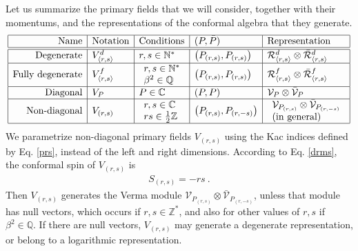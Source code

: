 \documentclass[12pt, a4paper]{article}
\theoremstyle{break}
\begin{document}
Let us summarize the primary fields that we will consider, together with their momentums, and the representations of the conformal algebra that they generate. 
\begin{align}
 \begin{array}{|r|l|l|l|l|}
  \hline 
  \text{Name} & \text{Notation} & \text{Conditions} & (P, \bar P) & \text{Representation}
  \\
  \hline \hline 
  \text{Degenerate} &  V^d_{\langle r,s\rangle} &  r,s\in\mathbb{N}^* & \left(P_{(r,s)},P_{(r,s)}\right)  & \mathcal{R}^d_{\langle r,s\rangle}\otimes \bar{\mathcal{R}}^d_{\langle r,s\rangle} 
  \\
  \hline 
  \text{Fully degenerate} & V^f_{\langle r,s\rangle} & \begin{array}{l} r,s\in\mathbb{N}^* \\ \beta^2\in\mathbb{Q} \end{array} & \left(P_{(r,s)},P_{(r,s)}\right)  & \mathcal{R}^f_{\langle r,s\rangle}\otimes \bar{\mathcal{R}}^f_{\langle r,s\rangle} 
  \\
  \hline 
  \text{Diagonal} & V_P & P\in\mathbb{C} & \left(P,P\right) & \mathcal{V}_P\otimes \bar{\mathcal{V}}_P 
  \\
  \hline 
  \text{Non-diagonal} & V_{(r,s)} & 
  \begin{array}{l} r,s\in\mathbb{C} \\ 
  rs\in \tfrac12\mathbb{Z} \end{array} & \left(P_{(r,s)},P_{(r,-s)}\right) & 
  \begin{array}{l} \mathcal{V}_{P_{(r,s)}} \otimes \bar{\mathcal{V}}_{P_{(r,-s)}} \\ \text{(in general)} \end{array}
  \\
  \hline 
 \end{array}
 \label{fields}
\end{align}
We parametrize non-diagonal primary fields $V_{(r,s)}$ using the Kac indices defined by Eq. \eqref{prs}, instead of the left and right dimensions. 
According to Eq. \eqref{drms}, the conformal spin of $V_{(r,s)}$ is 
\begin{align}
 \boxed{S_{(r,s)}= -rs} \ . 
 \label{srs}
\end{align}
Then $V_{(r,s)}$ generates the Verma module $\mathcal{V}_{P_{(r,s)}} \otimes \bar{\mathcal{V}}_{P_{(r,-s)}}$, unless that module has null vectors, which occurs if $r,s\in\mathbb{Z}^*$, and also for other values of $r,s$ if $\beta^2\in\mathbb{Q}$. If there are null vectors, $V_{(r,s)}$ may generate a degenerate representation, or belong to a logarithmic representation. 
\end{document}

